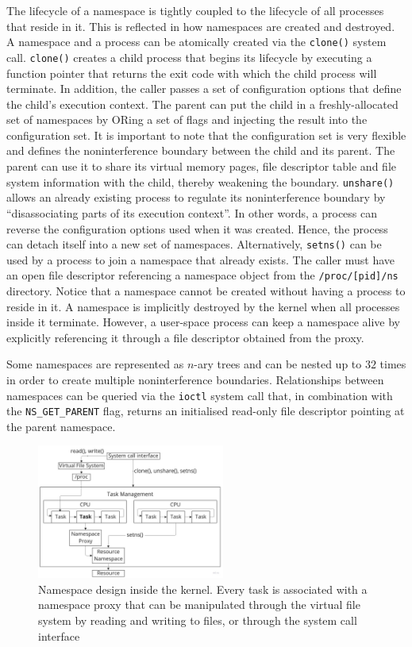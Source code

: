 The lifecycle of a namespace is tightly coupled to the lifecycle of all processes that reside in it. 
This is reflected in how namespaces are created and destroyed. 
A namespace and a process can be atomically created via the \verb|clone()| system call.
\verb|clone()| creates a child process that begins its lifecycle by executing 
a function pointer that returns the exit code with which the child process will terminate.
In addition, the caller passes a set of configuration options that define the child's execution context.
The parent can put the child in a freshly-allocated set of namespaces by ORing a set of flags 
and injecting the result into the configuration set. It is important to note that the 
configuration set is very flexible and defines the noninterference boundary between the child and its parent. 
The parent can use it to share its virtual memory pages, file descriptor table and file system information 
with the child, thereby weakening the boundary. 
\verb|unshare()| allows an already existing process to regulate its noninterference boundary by
\enquote{disassociating parts of its execution context}. In other words, a process can 
reverse the configuration options used when it was created.
Hence, the process can detach itself into a new set of namespaces.
Alternatively, \verb|setns()| can be used by a process to join a namespace that already exists. The caller 
must have an open file descriptor referencing a namespace object from the \verb|/proc/[pid]/ns| directory. 
Notice that a namespace cannot be created without having a process to reside in it. 
A namespace is implicitly 
destroyed by the kernel when all processes inside it terminate. 
However, a user-space process can keep a namespace alive by explicitly referencing it through a 
file descriptor obtained from the proxy.

Some namespaces are represented as $n$-ary trees and can be nested up to $32$ times in order to create multiple 
noninterference boundaries. Relationships between namespaces can be queried via the \verb|ioctl|
system call that, in combination with the \verb|NS_GET_PARENT| flag, returns an initialised read-only file descriptor pointing at 
the parent namespace. 

\begin{figure}[H]
    \centering
    \includegraphics[width=0.55\textwidth]{images/fundamentals/ns-overview.jpg}
    \caption{Namespace design inside the kernel. Every task is associated with a namespace proxy that can be manipulated 
    through the virtual file system by reading and writing to files, or through the system call interface}
    \label{images:fundamentals/ns-overview.jpg}
\end{figure}

